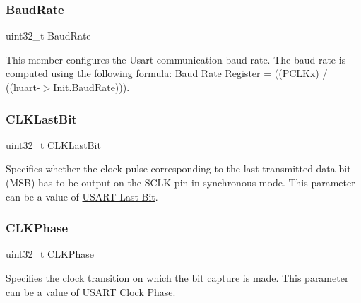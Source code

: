 \subsubsection{\texorpdfstring{Baud\+Rate}{BaudRate}}
{\footnotesize\ttfamily uint32\+\_\+t Baud\+Rate}

This member configures the Usart communication baud rate. The baud rate is computed using the following formula\+: Baud Rate Register = ((P\+C\+L\+Kx) / ((huart-\/$>$Init.\+Baud\+Rate))). \mbox{\label{struct_u_s_a_r_t___init_type_def_abf58d9d3c7c5f08ad9624410d22d04c8}} 
\subsubsection{\texorpdfstring{C\+L\+K\+Last\+Bit}{CLKLastBit}}
{\footnotesize\ttfamily uint32\+\_\+t C\+L\+K\+Last\+Bit}

Specifies whether the clock pulse corresponding to the last transmitted data bit (M\+SB) has to be output on the S\+C\+LK pin in synchronous mode. This parameter can be a value of \hyperlink{group___u_s_a_r_t___last___bit}{U\+S\+A\+RT Last Bit}. \mbox{\label{struct_u_s_a_r_t___init_type_def_aba7183911cbc41063270dab182de768f}} 
\subsubsection{\texorpdfstring{C\+L\+K\+Phase}{CLKPhase}}
{\footnotesize\ttfamily uint32\+\_\+t C\+L\+K\+Phase}

Specifies the clock transition on which the bit capture is made. This parameter can be a value of \hyperlink{group___u_s_a_r_t___clock___phase}{U\+S\+A\+RT Clock Phase}. \mbox{\label{struct_u_s_a_r_t___init_type_def_a83f278c9d173d3cd021644692bf3c435}} 
